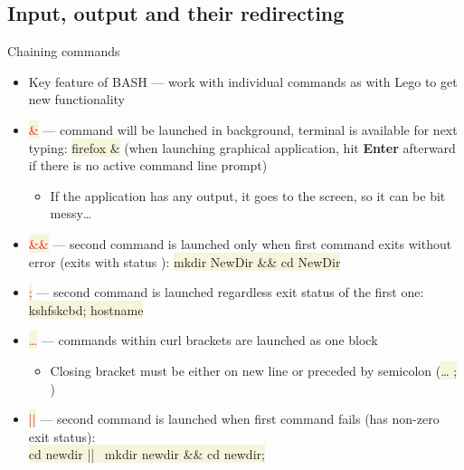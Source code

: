 \documentclass[compress, xelatex, 11pt, xcolor=svgnames, aspectratio=169, url={hyphens, lowtilde}]{beamer}
\renewcommand{\texttt}[1]{\colorbox{Beige}{{\ttfamily #1}}}
\renewcommand{\alert}[1]{\textcolor{red}{#1}}
\begin{document}
%     

\subsection[Chaining]{Input, output and their redirecting}

\begin{frame}[allowframebreaks]{Chaining commands}
	\begin{itemize}
		\item Key feature of BASH --- work with individual commands as with Lego to get new functionality
		\item \alert{\texttt{\&}} --- command will be launched in background, terminal is available for next typing: \texttt{firefox \&} (when launching graphical application, hit \textbf{Enter} afterward if there is no active command line prompt)
		\begin{itemize}
			\item If the application has any output, it goes to the screen, so it can be bit messy\ldots
		\end{itemize}
		\item \alert{\texttt{\&\&}} --- second command is launched only when first command exits without error (exits with status \texttt{0}): \texttt{mkdir NewDir \&\& cd NewDir}
		\item \alert{\texttt{;}} --- second command is launched regardless exit status of the first one: \texttt{kshfskcbd; hostname}
		\item \alert{\texttt{\textbraceleft\ldots\textbraceright}} --- commands within curl brackets are launched as one block
		\begin{itemize}
			\item Closing bracket \texttt{\textbraceright} must be either on new line or preceded by semicolon (\texttt{\ldots{ }; \textbraceright})
		\end{itemize}
		\item \alert{\texttt{||}} --- second command is launched when first command fails (has non-zero exit status):\\\texttt{cd newdir || \textbraceleft~mkdir newdir \&\& cd newdir; \textbraceright}
		\begin{itemize}

\end{itemize}
\end{itemize}
\end{frame}
\end{document}
